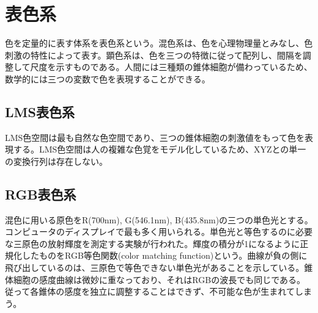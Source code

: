 \documentclass{jsarticle}
\begin{document}
	\section{表色系}
		色を定量的に表す体系を表色系という。混色系は、色を心理物理量とみなし、色刺激の特性によって表す。顕色系は、色を三つの特徴に従って配列し、間隔を調整して尺度を示すものである。人間には三種類の錐体細胞が備わっているため、数学的には三つの変数で色を表現することができる。
		\subsection{LMS表色系}
			LMS色空間は最も自然な色空間であり、三つの錐体細胞の刺激値をもって色を表現する。LMS色空間は人の複雑な色覚をモデル化しているため、XYZとの単一の変換行列は存在しない。
		\subsection{RGB表色系}
			混色に用いる原色をR(700nm), G(546.1nm), B(435.8nm)の三つの単色光とする。コンピュータのディスプレイで最も多く用いられる。単色光と等色するのに必要な三原色の放射輝度を測定する実験が行われた。輝度の積分が1になるように正規化したものをRGB等色関数(color matching function)という。曲線が負の側に飛び出しているのは、三原色で等色できない単色光があることを示している。錐体細胞の感度曲線は微妙に重なっており、それはRGBの波長でも同じである。従って各錐体の感度を独立に調整することはできず、不可能な色が生まれてしまう。
\end{document}
